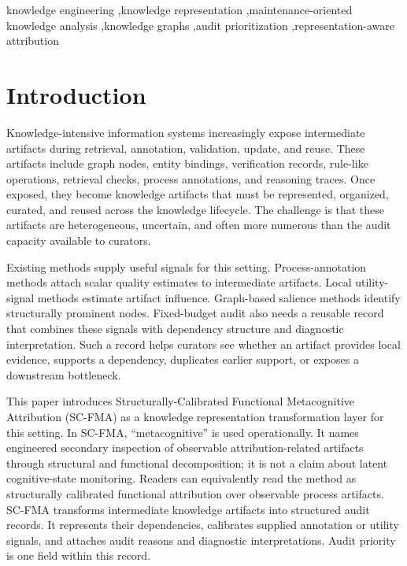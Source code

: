 \documentclass[a4paper,fleqn]{cas-sc}
\begin{document}
\begin{keywords}
knowledge engineering \sep knowledge representation \sep maintenance-oriented knowledge analysis \sep knowledge graphs \sep audit prioritization \sep representation-aware attribution
\end{keywords}

\maketitle

\section{Introduction}

Knowledge-intensive information systems increasingly expose intermediate artifacts during retrieval, annotation, validation, update, and reuse. These artifacts include graph nodes, entity bindings, verification records, rule-like operations, retrieval checks, process annotations, and reasoning traces. Once exposed, they become knowledge artifacts that must be represented, organized, curated, and reused across the knowledge lifecycle. The challenge is that these artifacts are heterogeneous, uncertain, and often more numerous than the audit capacity available to curators.

Existing methods supply useful signals for this setting. Process-annotation methods attach scalar quality estimates to intermediate artifacts. Local utility-signal methods estimate artifact influence. Graph-based salience methods identify structurally prominent nodes. Fixed-budget audit also needs a reusable record that combines these signals with dependency structure and diagnostic interpretation. Such a record helps curators see whether an artifact provides local evidence, supports a dependency, duplicates earlier support, or exposes a downstream bottleneck.

This paper introduces Structurally-Calibrated Functional Metacognitive Attribution (SC-FMA) as a knowledge representation transformation layer for this setting. In SC-FMA, ``metacognitive'' is used operationally. It names engineered secondary inspection of observable attribution-related artifacts through structural and functional decomposition; it is not a claim about latent cognitive-state monitoring. Readers can equivalently read the method as structurally calibrated functional attribution over observable process artifacts. SC-FMA transforms intermediate knowledge artifacts into structured audit records. It represents their dependencies, calibrates supplied annotation or utility signals, and attaches audit reasons and diagnostic interpretations. Audit priority is one field within this record.
\end{document}
